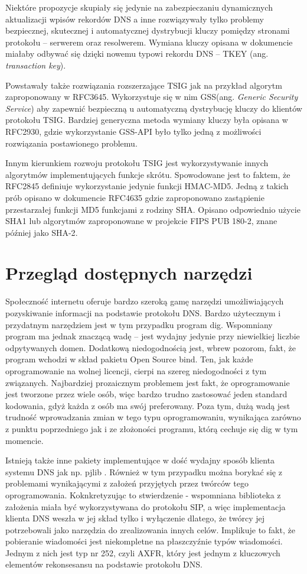 Niektóre propozycje skupiały się jedynie na zabezpieczaniu dynamicznych aktualizacji wpisów rekordów DNS \cite{RFC2137} a inne rozwiązywały tylko problemy bezpiecznej, skutecznej i automatycznej dystrybucji kluczy pomiędzy stronami protokołu -- serwerem oraz resolwerem\cite{RFC2930}. Wymiana kluczy opisana w dokumencie \cite{RFC2930} miałaby odbywać się dzięki nowemu typowi rekordu DNS -- TKEY (ang. \textit{transaction key}).

Powstawały także rozwiązania rozszerzające TSIG jak na przykład algorytm zaproponowany w RFC3645\cite{RFC3645}. Wykorzystuje się w nim GSS\cite{RFC2743}(ang. \textit{Generic Security Service}) aby zapewnić bezpieczną u automatyczną dystrybucję kluczy do klientów protokołu TSIG. Bardziej generyczna metoda wymiany kluczy była opisana w RFC2930\cite{RFC2930}, gdzie wykorzystanie GSS-API było tylko jedną z możliwości rozwiązania postawionego problemu.

Innym kierunkiem rozwoju protokołu TSIG jest wykorzystywanie innych algorytmów implementujących funkcje skrótu. Spowodowane jest to faktem, że RFC2845\cite{RFC2845} definiuje wykorzystanie jedynie funkcji HMAC-MD5. Jedną z takich prób opisano w dokumencie RFC4635\cite{RFC4635} gdzie zaproponowano zastąpienie przestarzałej funkcji MD5 funkcjami z rodziny SHA. Opisano odpowiednio użycie SHA1\cite{RFC3174} lub algorytmów zaproponowane w projekcie FIPS PUB 180-2, znane później jako SHA-2\cite{RFC4634}.

\chapter{Przegląd dostępnych narzędzi}
Społeczność internetu oferuje bardzo szeroką gamę narzędzi umożliwiających pozyskiwanie informacji na podstawie protokołu DNS. Bardzo użytecznym i przydatnym narzędziem jest w tym przypadku program dig. Wspomniany program ma jednak znaczącą wadę -- jest wydajny jedynie przy niewielkiej liczbie odpytywanych domen. Dodatkową niedogodnością jest, wbrew pozorom, fakt, że program wchodzi w skład pakietu Open Source bind. Ten, jak każde oprogramowanie na wolnej licencji, cierpi na szereg niedogodności z tym związanych. Najbardziej prozaicznym problemem jest fakt, że oprogramowanie jest tworzone przez wiele osób, więc bardzo trudno zastosować jeden standard kodowania, gdyż każda z osób ma swój preferowany. Poza tym, dużą wadą jest trudność wprowadzania zmian w tego typu oprogramowaniu, wynikająca zarówno z punktu poprzedniego jak i ze złożoności programu, którą cechuje się dig w tym momencie.

Istnieją także inne pakiety implementujące w dość wydajny sposób klienta systemu DNS jak np. pjlib \cite{pjlib}. Również w tym przypadku można borykać się z problemami wynikającymi z założeń przyjętych przez twórców tego oprogramowania. Koknkretyzując to stwierdzenie - wspomniana biblioteka z założenia miała być wykorzystywana do protokołu SIP, a więc implementacja klienta DNS weszła w jej skład tylko i wyłączenie dlatego, że twórcy jej potrzebowali jako narzędzia do zrealizowania innych celów. Implikuje to fakt, że pobieranie wiadomości jest niekompletne na płaszczyźnie typów wiadomości. Jednym z nich jest typ nr 252, czyli AXFR, który jest jednym z kluczowych elementów rekonsesansu na podstawie protokołu DNS.